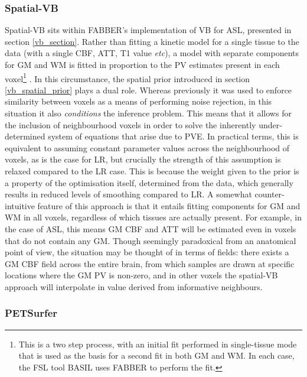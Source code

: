 \subsubsection{Spatial-VB}
\label{fabber_pvec}

Spatial-VB sits within FABBER's implementation of VB for ASL, presented in section \ref{vb_section}. Rather than fitting a kinetic model for a single tissue to the data (with a single CBF, ATT, T1 value \textit{etc}), a model with separate components for GM and WM is fitted in proportion to the PV estimates present in each voxel\footnote{This is a two step process, with an initial fit performed in single-tissue mode that is used as the basis for a second fit in both GM and WM. In each case, the FSL tool BASIL uses FABBER to perform the fit.} \cite{Chappell2011}. In this circumstance, the spatial prior introduced in section \ref{vb_spatial_prior} plays a dual role. Whereas previously it was used to enforce similarity between voxels as a means of performing noise rejection, in this situation it also \textit{conditions} the inference problem. This means that it allows for the inclusion of neighbourhood voxels in order to solve the inherently under-determined system of equations that arise due to PVE. In practical terms, this is equivalent to assuming constant parameter values across the neighbourhood of voxels, as is the case for LR, but crucially the strength of this assumption is relaxed compared to the LR case. This is because the weight given to the prior is a property of the optimisation itself, determined from the data, which generally results in reduced levels of smoothing compared to LR. A somewhat counter-intuitive feature of this approach is that it entails fitting components for GM and WM in all voxels, regardless of which tissues are actually present. For example, in the case of ASL, this means GM CBF and ATT will be estimated even in voxels that do not contain any GM. Though seemingly paradoxical from an anatomical point of view, the situation may be thought of in terms of fields: there exists a GM CBF field across the entire brain, from which samples are drawn at specific locations where the GM PV is non-zero, and in other voxels the spatial-VB approach will interpolate in value derived from informative neighbours. 

\subsubsection{PETSurfer}

